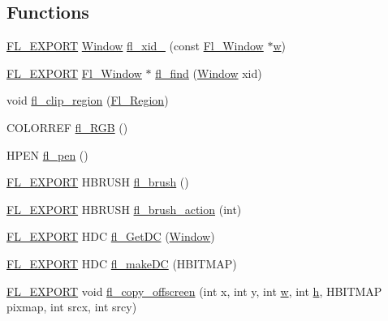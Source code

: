 \subsection*{Functions}
\begin{DoxyCompactItemize}
\item 
\hyperlink{_fl___export_8_h_aa9ba29a18aee9d738370a06eeb4470fc}{F\+L\+\_\+\+E\+X\+P\+O\+RT} \hyperlink{mac_8_h_a213656d363e884b651cc92f58e863fc6}{Window} \hyperlink{win32_8_h_a4daabfb0d38b46de684f3d88af173299}{fl\+\_\+xid\+\_\+} (const \hyperlink{class_fl___window}{Fl\+\_\+\+Window} $\ast$\hyperlink{forms_8_h_aac374e320caaadeca4874add33b62af2}{w})
\item 
\hyperlink{_fl___export_8_h_aa9ba29a18aee9d738370a06eeb4470fc}{F\+L\+\_\+\+E\+X\+P\+O\+RT} \hyperlink{class_fl___window}{Fl\+\_\+\+Window} $\ast$ \hyperlink{win32_8_h_a4f60f8f2a47f584ee83dd0118a058cfe}{fl\+\_\+find} (\hyperlink{mac_8_h_a213656d363e884b651cc92f58e863fc6}{Window} xid)
\item 
void \hyperlink{group__fl__drawings_gab12cb4aaa22092a0f2ae3d349c57f234}{fl\+\_\+clip\+\_\+region} (\hyperlink{mac_8_h_ac80c9f95cc93c989c5a953a749f45cb6}{Fl\+\_\+\+Region})
\item 
C\+O\+L\+O\+R\+R\+EF \hyperlink{win32_8_h_a09678d1ea1cab7c57430d2e1ea115b25}{fl\+\_\+\+R\+GB} ()
\item 
H\+P\+EN \hyperlink{win32_8_h_af4de604eda82469481e5ee68b6bbb5d1}{fl\+\_\+pen} ()
\item 
\hyperlink{_fl___export_8_h_aa9ba29a18aee9d738370a06eeb4470fc}{F\+L\+\_\+\+E\+X\+P\+O\+RT} H\+B\+R\+U\+SH \hyperlink{win32_8_h_a0d55d3bd507a98fdf06f23c106ba803c}{fl\+\_\+brush} ()
\item 
\hyperlink{_fl___export_8_h_aa9ba29a18aee9d738370a06eeb4470fc}{F\+L\+\_\+\+E\+X\+P\+O\+RT} H\+B\+R\+U\+SH \hyperlink{win32_8_h_a86c3730bc0b49d63db75571c722f2f67}{fl\+\_\+brush\+\_\+action} (int)
\item 
\hyperlink{_fl___export_8_h_aa9ba29a18aee9d738370a06eeb4470fc}{F\+L\+\_\+\+E\+X\+P\+O\+RT} H\+DC \hyperlink{win32_8_h_ab8c64c29fd758c51d58e815420d3fe61}{fl\+\_\+\+Get\+DC} (\hyperlink{mac_8_h_a213656d363e884b651cc92f58e863fc6}{Window})
\item 
\hyperlink{_fl___export_8_h_aa9ba29a18aee9d738370a06eeb4470fc}{F\+L\+\_\+\+E\+X\+P\+O\+RT} H\+DC \hyperlink{win32_8_h_ae0ea9637a51cabdbf0ba5405c8d915c5}{fl\+\_\+make\+DC} (H\+B\+I\+T\+M\+AP)
\item 
\hyperlink{_fl___export_8_h_aa9ba29a18aee9d738370a06eeb4470fc}{F\+L\+\_\+\+E\+X\+P\+O\+RT} void \hyperlink{win32_8_h_a0c14f584d9f59e17b7d9786d4e816a3d}{fl\+\_\+copy\+\_\+offscreen} (int x, int y, int \hyperlink{forms_8_h_aac374e320caaadeca4874add33b62af2}{w}, int \hyperlink{forms_8_h_a7e427ba5b307f9068129699250690066}{h}, H\+B\+I\+T\+M\+AP pixmap, int srcx, int srcy)

\end{DoxyCompactItemize}
